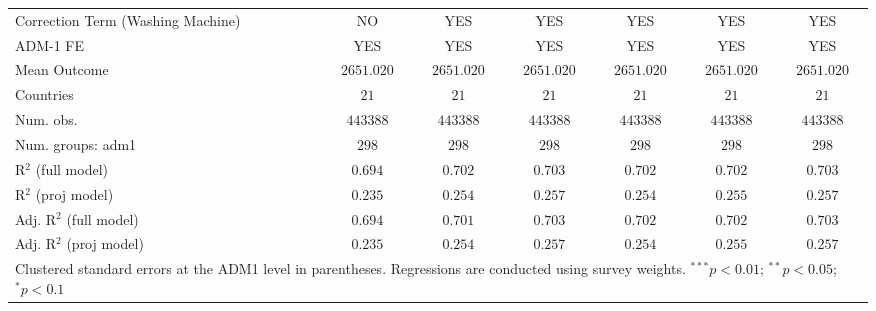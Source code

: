 \begin{table}[htbp]
\begin{center}
\begin{tabular}{l c c c c c c}
Correction Term (Washing Machine) & NO            & YES           & YES           & YES           & YES           & YES           \\
ADM-1 FE                          & YES           & YES           & YES           & YES           & YES           & YES           \\
Mean Outcome                      & $2651.020$    & $2651.020$    & $2651.020$    & $2651.020$    & $2651.020$    & $2651.020$    \\
Countries                         & $21$          & $21$          & $21$          & $21$          & $21$          & $21$          \\
Num. obs.                         & $443388$      & $443388$      & $443388$      & $443388$      & $443388$      & $443388$      \\
Num. groups: adm1                 & $298$         & $298$         & $298$         & $298$         & $298$         & $298$         \\
R$^2$ (full model)                & $0.694$       & $0.702$       & $0.703$       & $0.702$       & $0.702$       & $0.703$       \\
R$^2$ (proj model)                & $0.235$       & $0.254$       & $0.257$       & $0.254$       & $0.255$       & $0.257$       \\
Adj. R$^2$ (full model)           & $0.694$       & $0.701$       & $0.703$       & $0.702$       & $0.702$       & $0.703$       \\
Adj. R$^2$ (proj model)           & $0.235$       & $0.254$       & $0.257$       & $0.254$       & $0.255$       & $0.257$       \\
\hline
\multicolumn{7}{l}{\scriptsize{Clustered standard errors at the ADM1 level in parentheses. Regressions are conducted using survey weights. $^{***}p<0.01$; $^{**}p<0.05$; $^{*}p<0.1$}}
\end{tabular}
\label{main: tableA13}
\end{center}
\end{table}
